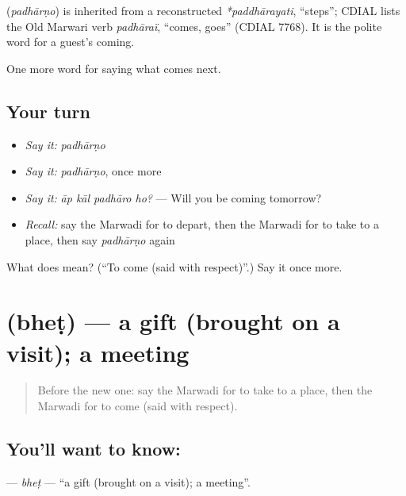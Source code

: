 \begin{cousinweb}
\textbf{} (\emph{padhārṇo}) is inherited from a reconstructed \emph{*paddhārayati}, \textquotedblleft{}steps\textquotedblright{}; CDIAL lists the Old Marwari verb \emph{padhāraï}, \textquotedblleft{}comes, goes\textquotedblright{} (CDIAL 7768). It is the polite word for a guest's coming.
\end{cousinweb}

\begin{grammarlens}[title={What you've built}]
One more word for saying what comes next.
\end{grammarlens}

\subsection*{Your turn}
\begin{itemize}
\raggedright
  \item \emph{Say it:} \emph{padhārṇo}
  \item \emph{Say it:} \emph{padhārṇo}, once more
  \item \emph{Say it:} \emph{āp kāl padhāro ho?} — Will you be coming tomorrow?
  \item \emph{Recall:} say the Marwadi for to depart, then the Marwadi for to take to a place, then say \emph{padhārṇo} again
\end{itemize}

\begin{tcolorbox}[breakable,colback=teal!4,colframe=teal!35!black,title={Before you move on}]
What does  mean? (\textquotedblleft{}To come (said with respect)\textquotedblright{}.) Say it once more.
\end{tcolorbox}
\section[\texorpdfstring{\mw{भेट} (bheṭ)}{भेट (bheṭ)}]{ (bheṭ) — a gift (brought on a visit); a meeting}

\label{lesson:MW-C219-bhet}



\begin{quote}
Before the new one: say the Marwadi for to take to a place, then the Marwadi for to come (said with respect).
\end{quote}

\subsection*{You'll want to know: }
\textbf{} — \emph{bheṭ} — \textquotedblleft{}a gift (brought on a visit); a meeting\textquotedblright{}.

